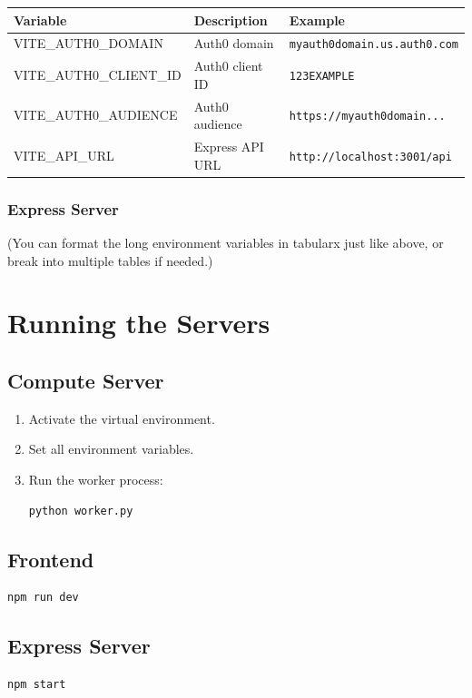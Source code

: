 \documentclass{article}
\begin{document}
\begin{tabularx}{\textwidth}{lXl}
\toprule
\textbf{Variable} & \textbf{Description} & \textbf{Example} \\
\midrule
VITE\_AUTH0\_DOMAIN & Auth0 domain & \texttt{myauth0domain.us.auth0.com} \\
VITE\_AUTH0\_CLIENT\_ID & Auth0 client ID & \texttt{123EXAMPLE} \\
VITE\_AUTH0\_AUDIENCE & Auth0 audience & \texttt{https://myauth0domain...} \\
VITE\_API\_URL & Express API URL & \texttt{http://localhost:3001/api} \\
\bottomrule
\end{tabularx}

\subsubsection*{Express Server}

(You can format the long environment variables in tabularx just like above, or break into multiple tables if needed.)

\section{Running the Servers}

\subsection{Compute Server}
\begin{enumerate}
    \item Activate the virtual environment.
    \item Set all environment variables.
    \item Run the worker process:
\begin{Verbatim}[fontsize=\small]
python worker.py
\end{Verbatim}
\end{enumerate}

\subsection{Frontend}
\begin{Verbatim}[fontsize=\small]
npm run dev
\end{Verbatim}

\subsection{Express Server}
\begin{Verbatim}[fontsize=\small]
npm start
\end{Verbatim}
\end{document}
